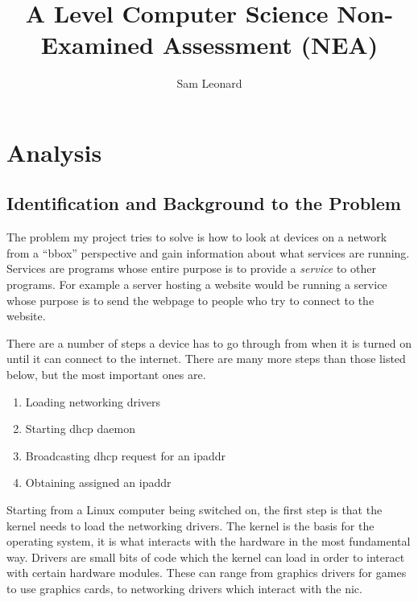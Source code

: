 \documentclass[titlepage]{article}
\author{Sam Leonard}
\title{A Level Computer Science Non-Examined Assessment (NEA)}
\date{} %
\let\Oldsection\section{}
\renewcommand{\section}{\clearpage\FloatBarrier\Oldsection}
\let\Oldsubsection\subsection{}
\renewcommand{\subsection}{\FloatBarrier\Oldsubsection}
\begin{document}
\maketitle

\tableofcontents

\setlength{\parskip}{6pt plus 1pt minus 1pt}

\section{Analysis}

\subsection{Identification and Background to the Problem}

The problem my project tries to solve is how to look at devices on a network from a 
``\gls{bbox}'' perspective and gain information about what \glspl{service} are running.
Services are programs whose entire purpose is to provide a \textit{\gls{service}} to other programs.
For example a server hosting a website would be running a \gls{service} whose purpose is to send the 
webpage to people who try to connect to the website.

There are a number of steps a device has to go through from when it is turned on until it
can connect to the internet.
There are many more steps than those listed below, but the most important ones are.

\begin{enumerate}
  \item{Loading networking \glspl{driver}}
  \item{Starting \gls{dhcp} \gls{daemon}}
  \item{Broadcasting \gls{dhcp} request for an \gls{ipaddr}}
  \item{Obtaining assigned an \gls{ipaddr}}
\end{enumerate}

Starting from a Linux computer being switched on, the first step is that the \gls{kernel} needs to load the 
networking \glspl{driver}. The \gls{kernel} is the basis for the operating system, it is what 
interacts with the hardware in the most fundamental way. Drivers are small bits of code which 
the \gls{kernel} can load in order to interact with certain hardware modules.
These can range from graphics drivers for games to use graphics cards, to networking drivers
which interact with the \gls{nic}.
\end{document}
